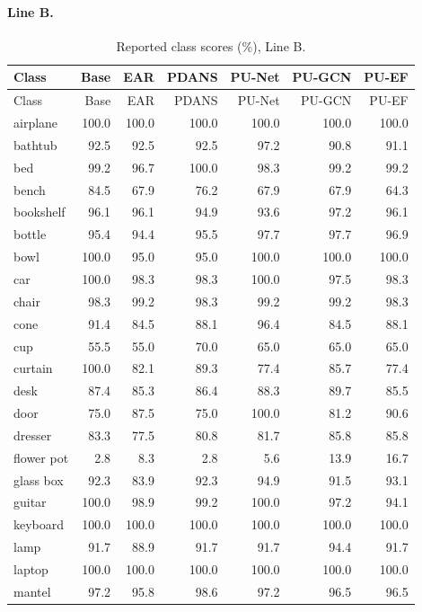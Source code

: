 \paragraph{Line B.}
{\setlength{\tabcolsep}{3pt}
\begin{longtable}{lrrrrrr}
\caption{Reported class scores (\%), Line B.}\\
\toprule Class & Base & EAR & PDANS & PU-Net & PU-GCN & PU-EF\\\midrule\endfirsthead
\toprule Class & Base & EAR & PDANS & PU-Net & PU-GCN & PU-EF\\\midrule\endhead
\bottomrule\endfoot
airplane & 100.0 & 100.0 & 100.0 & 100.0 & 100.0 & 100.0 \\
bathtub & 92.5 & 92.5 & 92.5 & 97.2 & 90.8 & 91.1 \\
bed & 99.2 & 96.7 & 100.0 & 98.3 & 99.2 & 99.2 \\
bench & 84.5 & 67.9 & 76.2 & 67.9 & 67.9 & 64.3 \\
bookshelf & 96.1 & 96.1 & 94.9 & 93.6 & 97.2 & 96.1 \\
bottle & 95.4 & 94.4 & 95.5 & 97.7 & 97.7 & 96.9 \\
bowl & 100.0 & 95.0 & 95.0 & 100.0 & 100.0 & 100.0 \\
car & 100.0 & 98.3 & 98.3 & 100.0 & 97.5 & 98.3 \\
chair & 98.3 & 99.2 & 98.3 & 99.2 & 99.2 & 98.3 \\
cone & 91.4 & 84.5 & 88.1 & 96.4 & 84.5 & 88.1 \\
cup & 55.5 & 55.0 & 70.0 & 65.0 & 65.0 & 65.0 \\
curtain & 100.0 & 82.1 & 89.3 & 77.4 & 85.7 & 77.4 \\
desk & 87.4 & 85.3 & 86.4 & 88.3 & 89.7 & 85.5 \\
door & 75.0 & 87.5 & 75.0 & 100.0 & 81.2 & 90.6 \\
dresser & 83.3 & 77.5 & 80.8 & 81.7 & 85.8 & 85.8 \\
flower pot & 2.8 & 8.3 & 2.8 & 5.6 & 13.9 & 16.7 \\
glass box & 92.3 & 83.9 & 92.3 & 94.9 & 91.5 & 93.1 \\
guitar & 100.0 & 98.9 & 99.2 & 100.0 & 97.2 & 94.1 \\
keyboard & 100.0 & 100.0 & 100.0 & 100.0 & 100.0 & 100.0 \\
lamp & 91.7 & 88.9 & 91.7 & 91.7 & 94.4 & 91.7 \\
laptop & 100.0 & 100.0 & 100.0 & 100.0 & 100.0 & 100.0 \\
mantel & 97.2 & 95.8 & 98.6 & 97.2 & 96.5 & 96.5 \\

\end{longtable}}
